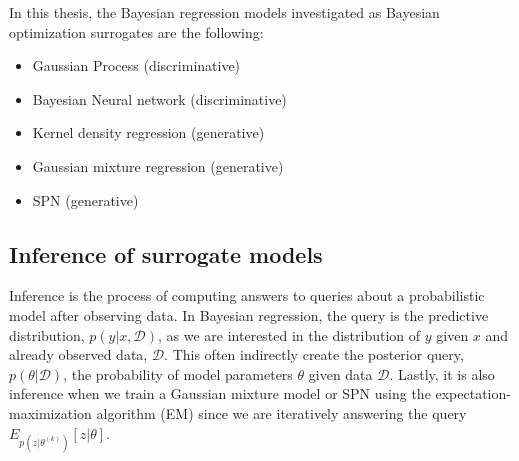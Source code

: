 In this thesis, the Bayesian regression models investigated as Bayesian optimization surrogates are
the following:
\begin{itemize}[noitemsep]
    \item Gaussian Process (discriminative)
    \item Bayesian Neural network (discriminative)
    \item Kernel density regression (generative)
    \item Gaussian mixture regression (generative)
    \item SPN (generative)
\end{itemize}



\subsection{Inference of surrogate models}
Inference is the process of computing answers to queries about a probabilistic model after observing
data. In Bayesian regression, the query is the predictive distribution, $p(y|x,\mathcal{D})$, as we
are interested in the distribution of $y$ given $x$ and already observed data, $\mathcal{D}$. This
often indirectly create the posterior query, $p(\theta|\mathcal{D})$, the probability of model
parameters $\theta$ given data $\mathcal{D}$. Lastly, it is also inference when we train a Gaussian
mixture model or SPN using the expectation-maximization algorithm (EM) since we are iteratively
answering the query $E_{p(z|\theta^{(k)})}[z|\theta]$.

